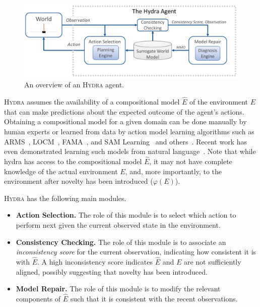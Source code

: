 \documentclass[letterpaper]{article} %
\newcommand{\hydra}{\textsc{Hydra}\xspace} %
\begin{document}
\begin{figure}
	\centering
	\includegraphics[width=\columnwidth]{hydra-cropped.pdf}
	\caption{An overview of an \hydra agent.}
	\label{fig:hydra-overview}
\end{figure}

\hydra assumes the availability of a compositional model $\hat{E}$ of the environment $E$ that can make predictions about the expected outcome of the agent's actions. 
Obtaining a compositional model for a given domain can be done manually by human experts  
or learned from data by action model learning algorithms such as ARMS~\cite{wu2007arms}, LOCM~\cite{cresswell2013acquiring}, FAMA~\cite{aineto19learning}, and SAM Learning~\cite{juba2021kr} and others~\cite{asai2020learning}. 
Recent work has even demonstrated learning such models from natural language~\cite{feng2018extracting,lindsay2017framer}. 
Note that while hydra has access to the compositional model $\hat{E}$, it may not have complete knowledge of the actual environment $E$, and, more importantly, to the environment after novelty has been introduced ($\varphi(E)$). 


\noindent \hydra has the following main modules. 
\begin{itemize}
\item \textbf{Action Selection.} The role of this module is to select which action to perform next given the current observed state in the environment.
\item \textbf{Consistency Checking.} The role of this module is to associate an \emph{inconsistency score} for the current observation, indicating how consistent it is with $\hat{E}$. A high inconsistency score indicates $\hat{E}$ and $E$ are not sufficiently aligned, possibly suggesting that novelty has been introduced. 
\item \textbf{Model Repair.} The role of this module is to modify the relevant components of $\hat{E}$ such that it is consistent with the recent observations. 
\end{itemize}
\end{document}
